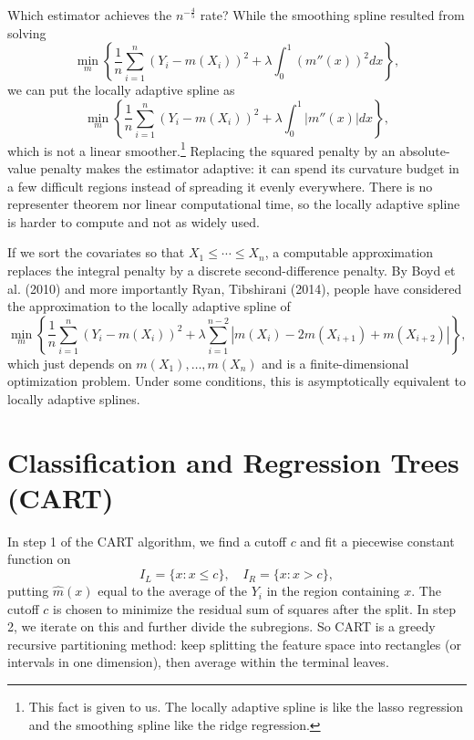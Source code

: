Which estimator achieves the $n^{-\frac{4}{5}}$ rate? While the smoothing spline resulted from solving \[
	\min_m \left\{\frac{1}{n} \sum\limits_{i=1}^{n} \left( Y_i - m(X_i) \right)^2 + \lambda \int_{0}^{1} \left( m''(x)\right)^2 dx \right\}
,\] we can put the locally adaptive spline as  \[
	\min_m \left\{\frac{1}{n} \sum\limits_{i=1}^{n} \left( Y_i - m(X_i) \right)^2 + \lambda \int_{0}^{1} \left| m''(x) \right| dx \right\}
,\] 
which is not a linear smoother.\footnote{This fact is given to us. The locally adaptive spline is like the lasso regression and the smoothing spline like the ridge regression.} Replacing the squared penalty by an absolute-value penalty makes the estimator adaptive: it can spend its curvature budget in a few difficult regions instead of spreading it evenly everywhere. There is no representer theorem nor linear computational time, so the locally adaptive spline is harder to compute and not as widely used.

If we sort the covariates so that $X_1 \le \cdots \le X_n$, a computable approximation replaces the integral penalty by a discrete second-difference penalty. By Boyd et al. (2010) and more importantly Ryan, Tibshirani (2014), people have considered the approximation to the locally adaptive spline of \[
	\min_m \left\{\frac{1}{n }\sum\limits_{i=1}^{n} \left( Y_i - m(X_i) \right)^2 + \lambda \sum\limits_{i=1}^{n-2} \left| m(X_i) - 2m(X_{i+1}) + m(X_{i+2}) \right|\right\}
,\] 
which just depends on $m(X_1),\ldots,m(X_n)$ and is a finite-dimensional optimization problem. Under some conditions, this is asymptotically equivalent to locally adaptive splines.

\section{Classification and Regression Trees (CART)}

In step 1 of the CART algorithm, we find a cutoff $c$ and fit a piecewise constant function on
\[
	I_L = \{x: x \le c\}, \quad I_R = \{x: x > c\}
,\]
putting $\hat{m}(x)$ equal to the average of the $Y_i$ in the region containing $x$. The cutoff $c$ is chosen to minimize the residual sum of squares after the split.
In step 2, we iterate on this and further divide the subregions. So CART is a greedy recursive partitioning method: keep splitting the feature space into rectangles (or intervals in one dimension), then average within the terminal leaves.


